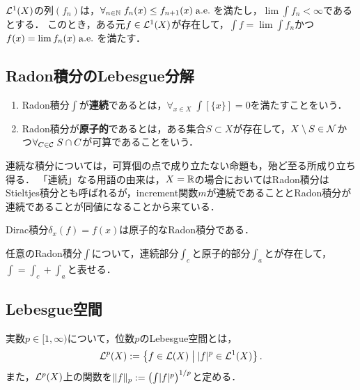 \documentclass[uplatex,dvipdfmx]{jsreport}
\begin{document}
\begin{theorem}
    $\mathcal{L}^1(X)$の列$(f_n)$は，$\forall_{n\in\mathbb{N}}\;f_n(x)\le f_{n+1}(x)\;\mathrm{a.e.}\;$を満たし，$\lim\int f_n<\infty$であるとする．
    このとき，ある元$f\in\mathcal{L}^1(X)$が存在して，$\int f=\lim\int f_n$かつ$f(x)=\lim f_n(x)\;\mathrm{a.e.}\;$を満たす．
\end{theorem}

\subsection{Radon積分のLebesgue分解}

\begin{definition}\mbox{}\label{def-diffuse-atomic}
    \begin{enumerate}
        \item Radon積分$\int$が\textbf{連続}であるとは，$\forall_{x\in X}\;\int[\{x\}]=0$を満たすことをいう．
        \item Radon積分が\textbf{原子的}であるとは，ある集合$S\subset X$が存在して，$X\setminus S\in\mathcal{N}$かつ$\forall_{C\in\mathcal{C}}\;S\cap C$が可算であることをいう．
    \end{enumerate}
\end{definition}
\begin{remarks}
    連続な積分については，可算個の点で成り立たない命題も，殆ど至る所成り立ち得る．
    「連続」なる用語の由来は，$X=\mathbb{R}$の場合においてはRadon積分はStieltjes積分とも呼ばれるが，increment関数$m$が連続であることとRadon積分が連続であることが同値になることから来ている．
\end{remarks}
\begin{example}
    Dirac積分$\delta_x(f)=f(x)$は原子的なRadon積分である．
\end{example}

\begin{lemma}
    任意のRadon積分$\int$について，連続部分$\int_c$と原子的部分$\int_a$とが存在して，$\int=\int_c+\int_a$と表せる．
\end{lemma}

\subsection{Lebesgue空間}

\begin{definition}
    実数$p\in[1,\infty)$について，位数$p$のLebesgue空間とは，
    \[\mathcal{L}^p(X):=\left\{f\in\mathcal{L}(X)\;\middle|\;\lvert f\rvert^p\in\mathcal{L}^1(X)\right\}.\]
    また，$\mathcal{L}^p(X)$上の関数を$\|f\|_p:=\left(\int\lvert f\rvert^p\right)^{1/p}$と定める．
\end{definition}
\end{document}
